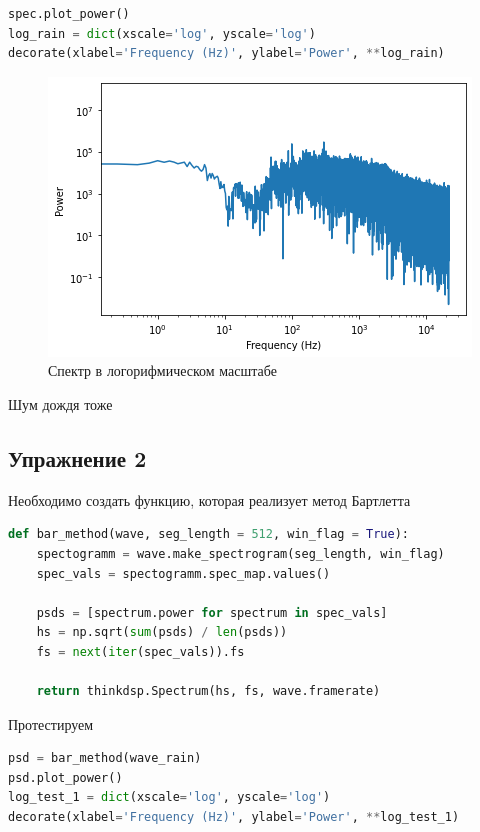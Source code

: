 \begin{lstlisting}[language=Python]
spec.plot_power()
log_rain = dict(xscale='log', yscale='log')
decorate(xlabel='Frequency (Hz)', ylabel='Power', **log_rain)
\end{lstlisting}

\begin{figure}[H]
	\begin{center}
		\includegraphics[scale=1]{fig/lab04/lab04_04.png}
		\caption{Спектр в логорифмическом масштабе}
	\end{center}
\end{figure}

Шум дождя тоже

\subsection{Упражнение 2}

Необходимо создать функцию, которая реализует метод Бартлетта

\begin{lstlisting}[language=Python]
def bar_method(wave, seg_length = 512, win_flag = True):
    spectogramm = wave.make_spectrogram(seg_length, win_flag)
    spec_vals = spectogramm.spec_map.values()

    psds = [spectrum.power for spectrum in spec_vals]
    hs = np.sqrt(sum(psds) / len(psds))
    fs = next(iter(spec_vals)).fs

    return thinkdsp.Spectrum(hs, fs, wave.framerate)
\end{lstlisting}

Протестируем

\begin{lstlisting}[language=Python]
psd = bar_method(wave_rain)
psd.plot_power()
log_test_1 = dict(xscale='log', yscale='log')
decorate(xlabel='Frequency (Hz)', ylabel='Power', **log_test_1)
\end{lstlisting}

